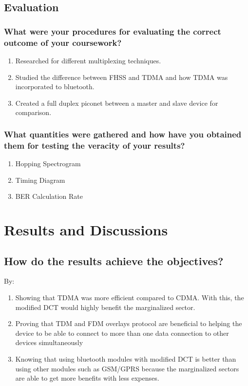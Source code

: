 \subsection{Evaluation}
\label{sec:eval}

\subsubsection{What were your procedures for evaluating the correct outcome of your coursework?}
\begin{enumerate}
	\item Researched for different multiplexing techniques.
	\item Studied the difference between FHSS and TDMA and how TDMA was incorporated to bluetooth.
	\item Created a full duplex piconet between a master and slave device for comparison.
\end{enumerate}

\subsubsection{What quantities were gathered and how have you obtained them for testing the veracity of your results?}

\begin{enumerate}
	\item Hopping Spectrogram
	\item Timing Diagram
	\item BER Calculation Rate
\end{enumerate}


\section{Results and Discussions}

\subsection{How do the results achieve the objectives?}
By:
\begin{enumerate}
	\item Showing that TDMA was more efficient compared to CDMA. With this, the modified DCT would highly benefit the marginalized sector.
	\item Proving that TDM and FDM overlays protocol are beneficial to helping the device to be able to connect to more than one data connection to other devices simultaneously
	\item Knowing that using bluetooth modules with modified DCT is better than using other modules such as GSM/GPRS because the marginalized sectors are able to get more benefits with less expenses.
	
\end{enumerate}

